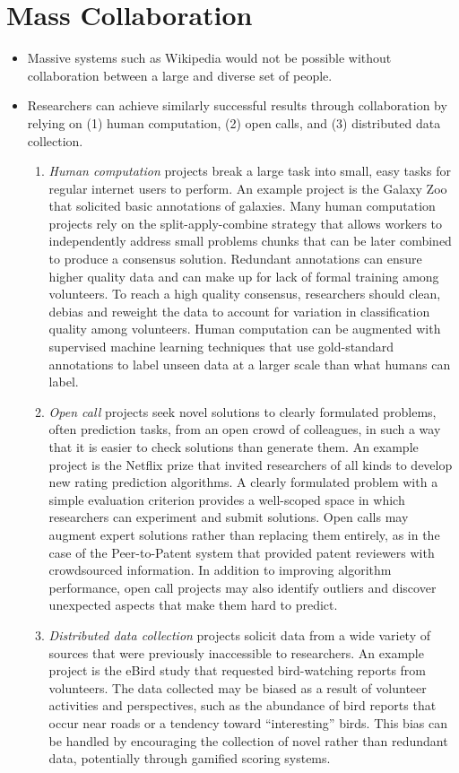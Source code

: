 \documentclass[11pt,letterpaper]{article}
\begin{document}
\section{Mass Collaboration}
\begin{itemize}
\item Massive systems such as Wikipedia would not be possible without collaboration between a large and diverse set of people. 
\item Researchers can achieve similarly successful results through collaboration by relying on (1) human computation, (2) open calls, and (3) distributed data collection.
\begin{enumerate}
\item \emph{Human computation} projects break a large task into small, easy tasks for regular internet users to perform. An example project is the Galaxy Zoo that solicited basic annotations of galaxies. Many human computation projects rely on the split-apply-combine strategy that allows workers to independently address small problems chunks that can be later combined to produce a consensus solution. Redundant annotations can ensure higher quality data and can make up for lack of formal training among volunteers. To reach a high quality consensus, researchers should clean, debias and reweight the data to account for variation in classification quality among volunteers. Human computation can be augmented with supervised machine learning techniques that use gold-standard annotations to label unseen data at a larger scale than what humans can label.
\item \emph{Open call} projects seek novel solutions to clearly formulated problems, often prediction tasks, from an open crowd of colleagues, in such a way that it is easier to check solutions than generate them. An example project is the Netflix prize that invited researchers of all kinds to develop new rating prediction algorithms. A clearly formulated problem with a simple evaluation criterion provides a well-scoped space in which researchers can experiment and submit solutions. Open calls may augment expert solutions rather than replacing them entirely, as in the case of the Peer-to-Patent system that provided patent reviewers with crowdsourced information. In addition to improving algorithm performance, open call projects may also identify outliers and discover unexpected aspects that make them hard to predict.
\item \emph{Distributed data collection} projects solicit data from a wide variety of sources that were previously inaccessible to researchers. An example project is the eBird study that requested bird-watching reports from volunteers. The data collected may be biased as a result of volunteer activities and perspectives, such as the abundance of bird reports that occur near roads or a tendency toward ``interesting'' birds. This bias can be handled by encouraging the collection of novel rather than redundant data, potentially through gamified scoring systems. 

\end{enumerate}
\end{itemize}
\end{document}
